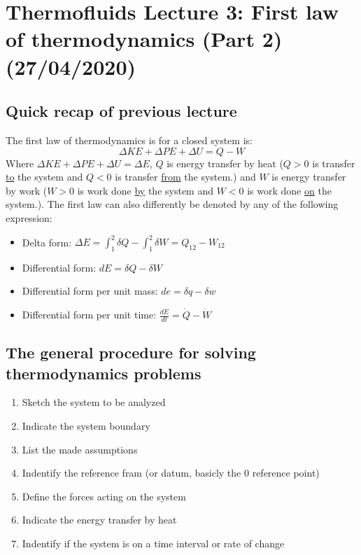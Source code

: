 \documentclass[11pt, a4paper]{article}
\begin{document}
\setcounter{section}{2}
\setcounter{equation}{0}
\section{Thermofluids Lecture 3: First law of thermodynamics (Part 2) (27/04/2020)}


\subsection{Quick recap of previous lecture}
The first law of thermodynamics is for a closed system is:
\begin{equation}
  \Delta KE + \Delta PE + \Delta U = Q - W
\end{equation}
Where $\Delta KE + \Delta PE + \Delta U = \Delta E$, $Q$ is energy transfer by heat ($Q > 0$ is transfer \underline{to} the system and $Q < 0$ is transfer \underline{from} the system.) and $W$ is energy transfer by work ($W > 0$ is work done \underline{by} the system and $W < 0$ is work done \underline{on} the system.).
The first law can also differently be denoted by any of the following expression:
\begin{itemize}
  \item Delta form: $\Delta E = \int_1^2 \delta Q - \int_1^2 \delta W = Q_{12} - W_{12}$
  \item Differential form: $dE = \delta Q - \delta W$
  \item Differential form per unit mass: $de = \delta q - \delta w$
  \item Differential form per unit time: $\frac{dE}{dt} = \dot{Q} - \dot{W}$
\end{itemize}


\subsection{The general procedure for solving thermodynamics problems}
\begin{enumerate}
  \item Sketch the system to be analyzed
  \item Indicate the system boundary
  \item List the made assumptions
  \item Indentify the reference fram (or datum, basicly the 0 reference point)
  \item Define the forces acting on the system
  \item Indicate the energy transfer by heat
  \item Indentify if the system is on a time interval or rate of change
\end{enumerate}
\end{document}
